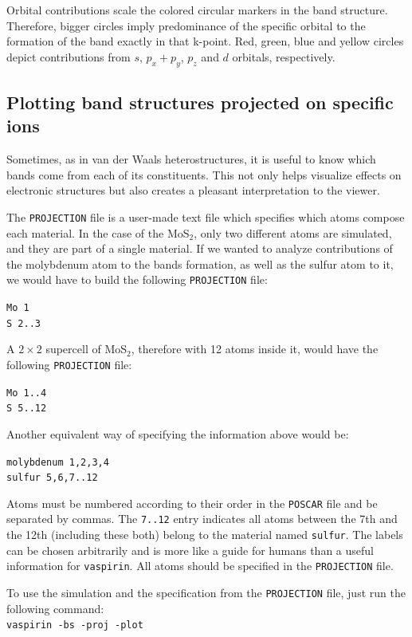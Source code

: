\documentclass{refart}
\begin{document}
 Orbital contributions scale the colored circular markers in the band structure. Therefore, bigger circles imply predominance of the specific orbital to the formation of the band exactly in that k-point. Red, green, blue and yellow circles depict contributions from $s$, $p_x + p_y$, $p_z$ and $d$ orbitals, respectively.

\subsection{Plotting band structures projected on specific ions} \label{sec:example-proj}

Sometimes, as in van der Waals heterostructures, it is useful to know which bands come from each of its constituents. This not only helps visualize effects on electronic structures but also creates a pleasant interpretation to the viewer.

 The \texttt{PROJECTION} file is a user-made text file which specifies which atoms compose each material. In the case of the MoS$_2$, only two different atoms are simulated, and they are part of a single material. If we wanted to analyze contributions of the molybdenum atom to the bands formation, as well as the sulfur atom to it, we would have to build the following \texttt{PROJECTION} file:

\texttt{Mo 1\\S 2..3}

A $2 \times 2$ supercell of MoS$_2$, therefore with 12 atoms inside it, would have the following \texttt{PROJECTION} file:

\texttt{Mo 1..4\\S 5..12}

Another equivalent way of specifying the information above would be:

\texttt{molybdenum 1,2,3,4\\sulfur 5,6,7..12}

Atoms must be numbered according to their order in the \texttt{POSCAR} file and be separated by commas. The \texttt{7..12} entry indicates all atoms between the 7th and the 12th (including these both) belong to the material named \texttt{sulfur}. The labels can be chosen arbitrarily and is more like a guide for humans than a useful information for \texttt{vaspirin}. All atoms should be specified in the \texttt{PROJECTION} file.

 To use the simulation and the specification from the \texttt{PROJECTION} file, just run the following command:\\
\texttt{vaspirin -bs -proj -plot}
\end{document}
